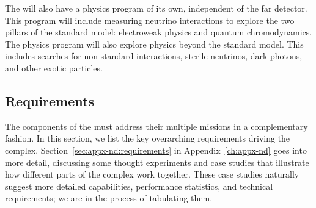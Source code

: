 

The  will also have a physics program of its own, independent of the far detector.  This program will include measuring neutrino interactions to explore the two pillars of the standard model: electroweak physics and quantum chromodynamics. The  physics program will also explore physics beyond the standard model. This includes searches for non-standard interactions, sterile neutrinos,  dark photons, and  other exotic particles.

\subsection{Requirements}
\label{sec:exsum-nd-requirements}

The components of the   must address their multiple missions in a complementary fashion. In this section, we list the key overarching requirements driving the  complex. Section~\ref{sec:appx-nd:requirements} in Appendix~\ref{ch:appx-nd} goes into more detail, discussing some thought experiments and case studies that illustrate how different parts of the complex work together. These case studies naturally suggest more detailed capabilities, performance statistics, and technical requirements; we are in the process of tabulating them. 

